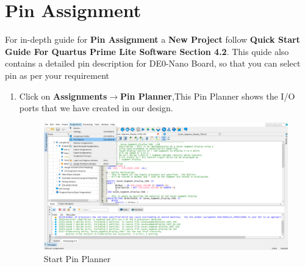 \documentclass[12pt,singleside,a4paper]{article}
\begin{document}
\section{Pin  Assignment}
For in-depth guide for \textbf{Pin Assignment} a \textbf{New Project} follow \textbf{Quick Start Guide For Quartus Prime Lite Software Section 4.2}. This quide also contains a detailed pin description for DE0-Nano Board, so that you can select pin as per your requirement
    \begin{enumerate}

    \item Click on \textbf{Assignments}$\rightarrow$\textbf{Pin Planner},This Pin    Planner shows the I/O ports that we have created in our design.
    \begin{figure}[H]
    \centering
    \includegraphics[width=14cm,keepaspectratio]{Project/Create8.png}
    \caption{Start Pin Planner}
    \end{figure}


\end{enumerate}
\end{document}
